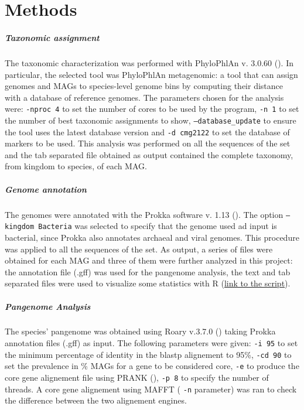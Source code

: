 \section*{Methods}




\nocite{Tange2011a}

\subparagraph*{Taxonomic assignment}

The taxonomic characterization was performed with PhyloPhlAn v. 3.0.60 (\cite{phylophlan}). In particular, the selected tool was PhyloPhlAn metagenomic: a tool that can assign genomes and MAGs to species-level genome bins by computing their distance with a database of reference genomes. The parameters chosen for the analysis were: \texttt{-nproc 4} to set the number of cores to be used by the program, \texttt{-n 1} to set the number of best taxonomic assignments to show, \texttt{--database\_update} to ensure the tool uses the latest database version and \texttt{-d cmg2122} to set the database of markers to be used. This analysis was performed on all the sequences of the set and the tab separated file obtained as output contained the complete taxonomy, from kingdom to species, of each MAG.

\subparagraph*{Genome annotation}

The genomes were annotated with the Prokka software v. 1.13 (\cite{prokka}). The option \texttt{--kingdom Bacteria} was selected to specify that the genome used ad input is bacterial, since Prokka also annotates archaeal and viral genomes. This procedure was applied to all the sequences of the set. As output, a series of files were obtained for each MAG and three of them were further analyzed in this project: the annotation file (.gff) was used for the pangenome analysis, the text and tab separated files were used to visualize some statistics with R (\href{https://github.com/enricofrigoli/cmg_project/blob/main/Rscript/CMG_Rscript.md}{link to the script}).



\subparagraph*{Pangenome Analysis}

The species' pangenome was obtained using Roary v.3.7.0 (\cite{Roary}) taking Prokka annotation files (.gff) as input. 
The following parameters were given: \texttt{-i 95} to set the minimum percentage of identity
in the blastp alignement to 95\%, \texttt{-cd 90} to set the prevalence in \% MAGs for a gene
to be considered core, \texttt{-e} to produce the core gene alignement file using PRANK (\cite{prank}), \texttt{-p 8} to
specify the number of threads. A core gene alignement using MAFFT ( \texttt{-n} parameter) was ran to check
the difference between the two alignement engines.

